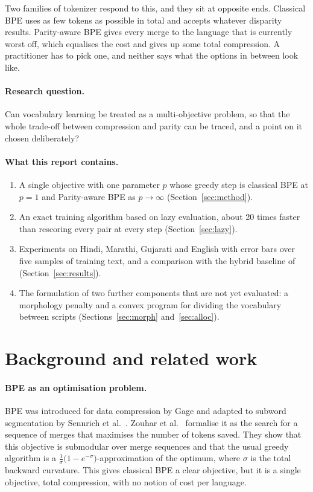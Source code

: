 \documentclass[11pt,a4paper]{article}
\theoremstyle{remark}
\begin{document}
Two families of tokenizer respond to this, and they sit at opposite ends. Classical BPE
uses as few tokens as possible in total and accepts whatever disparity results.
Parity-aware BPE \cite{foroutan2026} gives every merge to the language that is currently
worst off, which equalises the cost and gives up some total compression. A practitioner has
to pick one, and neither says what the options in between look like.

\paragraph{Research question.} Can vocabulary learning be treated as a multi-objective
problem, so that the whole trade-off between compression and parity can be traced, and a
point on it chosen deliberately?

\paragraph{What this report contains.}
\begin{enumerate}
  \item A single objective with one parameter $p$ whose greedy step is classical BPE at
  $p=1$ and Parity-aware BPE as $p\to\infty$ (Section~\ref{sec:method}).
  \item An exact training algorithm based on lazy evaluation, about 20 times faster than
  rescoring every pair at every step (Section~\ref{sec:lazy}).
  \item Experiments on Hindi, Marathi, Gujarati and English with error bars over five
  samples of training text, and a comparison with the hybrid baseline of
  \cite{foroutan2026} (Section~\ref{sec:results}).
  \item The formulation of two further components that are not yet evaluated: a
  morphology penalty and a convex program for dividing the vocabulary between scripts
  (Sections~\ref{sec:morph} and~\ref{sec:alloc}).
\end{enumerate}

\section{Background and related work}

\paragraph{BPE as an optimisation problem.}
BPE was introduced for data compression by Gage \cite{gage1994} and adapted to subword
segmentation by Sennrich et al.\ \cite{sennrich2016}. Zouhar et al.\ \cite{zouhar2023}
formalise it as the search for a sequence of merges that maximises the number of tokens
saved. They show that this objective is submodular over merge sequences and that the usual
greedy algorithm is a
$\tfrac{1}{\sigma}\bigl(1-e^{-\sigma}\bigr)$-approximation of the optimum, where $\sigma$ is
the total backward curvature. This gives classical BPE a clear objective, but it is a single
objective, total compression, with no notion of cost per language.
\end{document}
